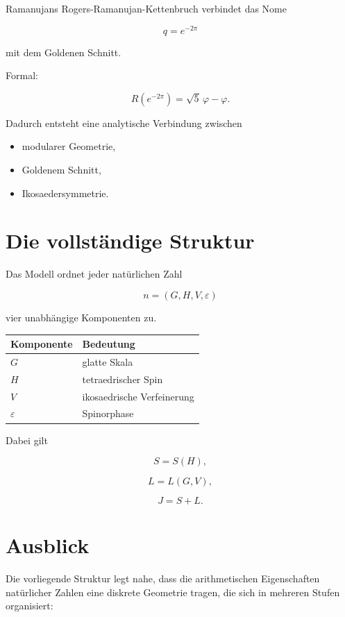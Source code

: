 \documentclass[11pt,a4paper]{article}
\begin{document}
	Ramanujans Rogers-Ramanujan-Kettenbruch verbindet
	das Nome
	
	\[
	q=e^{-2\pi}
	\]
	
	mit dem Goldenen Schnitt.
	
	Formal:
	
	\[
	R(e^{-2\pi})
	=
	\sqrt5\,\varphi-\varphi.
	\]
	
	Dadurch entsteht eine analytische Verbindung zwischen
	
	\begin{itemize}
		\item modularer Geometrie,
		\item Goldenem Schnitt,
		\item Ikosaedersymmetrie.
	\end{itemize}
	
	\section{Die vollständige Struktur}
	
	Das Modell ordnet jeder natürlichen Zahl
	
	\[
	n
	=
	(G,H,V,\varepsilon)
	\]
	
	vier unabhängige Komponenten zu.
	
	\begin{center}
		\begin{tabular}{ll}
			\toprule
			Komponente & Bedeutung\\
			\midrule
			$G$ & glatte Skala\\
			$H$ & tetraedrischer Spin\\
			$V$ & ikosaedrische Verfeinerung\\
			$\varepsilon$ & Spinorphase\\
			\bottomrule
		\end{tabular}
	\end{center}
	
	Dabei gilt
	
	\[
	S=S(H),
	\]
	
	\[
	L=L(G,V),
	\]
	
	\[
	J=S+L.
	\]
	
	\section{Ausblick}
	
	Die vorliegende Struktur legt nahe, dass die
	arithmetischen Eigenschaften natürlicher Zahlen
	eine diskrete Geometrie tragen, die sich in mehreren
	Stufen organisiert:
	
\end{document}
